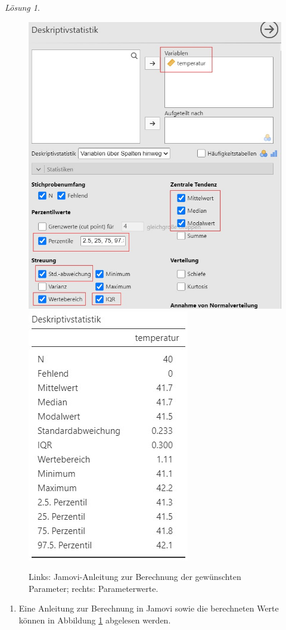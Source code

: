 \documentclass[
]{book}
\providecommand{\tightlist}{%
  \setlength{\itemsep}{0pt}\setlength{\parskip}{0pt}}
\theoremstyle{definition}
\theoremstyle{definition}
\theoremstyle{definition}
\theoremstyle{definition}
\theoremstyle{remark}
\newtheorem*{solution}{Lösung}
\begin{document}
\begin{solution}
\begin{figure}
\includegraphics[width=0.5\linewidth]{figures/02-exr-enten-hist-mean-sd-input} \includegraphics[width=0.5\linewidth]{figures/02-exr-enten-hist-mean-sd-output} \caption{Links: Jamovi-Anleitung zur Berechnung der gewünschten Parameter; rechts: Parameterwerte.}\label{fig:enten-hist-mean-sd2}
\end{figure}

\begin{enumerate}
\def\labelenumi{(\alph{enumi})}
\setcounter{enumi}{1}
\tightlist
\item
  Eine Anleitung zur Berechnung in Jamovi sowie die berechneten Werte können in Abbildung \ref{fig:enten-hist-mean-sd2} abgelesen werden.
\end{enumerate}

\end{solution}
\end{document}
